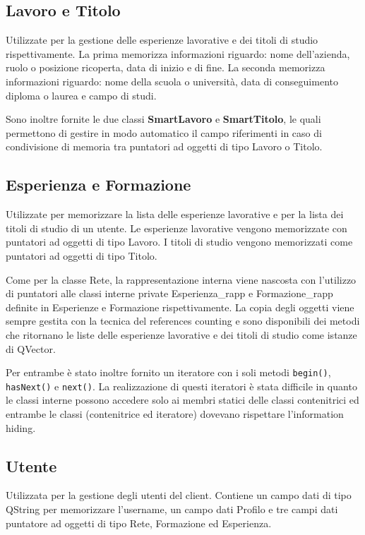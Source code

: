 \documentclass[a4paper]{article}
\begin{document}
\subsection*{Lavoro e Titolo}
Utilizzate per la gestione delle esperienze lavorative e dei titoli di studio rispettivamente. La prima memorizza informazioni riguardo: nome dell'azienda, ruolo o posizione ricoperta, data di inizio e di fine. La seconda memorizza informazioni riguardo: nome della scuola o università, data di conseguimento diploma o laurea e campo di studi.

Sono inoltre fornite le due classi \textbf{SmartLavoro} e \textbf{SmartTitolo}, le quali permettono di gestire in modo automatico il campo riferimenti in caso di condivisione di memoria tra puntatori ad oggetti di tipo Lavoro o Titolo.

\subsection*{Esperienza e Formazione}
Utilizzate per memorizzare la lista delle esperienze lavorative e per la lista dei titoli di studio di un utente. Le esperienze lavorative vengono memorizzate con puntatori ad oggetti di tipo Lavoro. I titoli di studio vengono memorizzati come puntatori ad oggetti di tipo Titolo.

Come per la classe Rete, la rappresentazione interna viene nascosta con l'utilizzo di puntatori alle classi interne private Esperienza\_rapp e Formazione\_rapp definite in Esperienze e Formazione rispettivamente. La copia degli oggetti viene sempre gestita con la tecnica del references counting e sono disponibili dei metodi che ritornano le liste delle esperienze lavorative e dei titoli di studio come istanze di QVector.

Per entrambe è stato inoltre fornito un iteratore con i soli metodi \texttt{begin()}, \texttt{hasNext()} e \texttt{next()}. La realizzazione di questi iteratori è stata difficile in quanto le classi interne possono accedere solo ai membri statici delle classi contenitrici ed entrambe le classi (contenitrice ed iteratore) dovevano rispettare l'information hiding.

\subsection*{Utente}
Utilizzata per la gestione degli utenti del client. Contiene un campo dati di tipo QString per memorizzare l'username, un campo dati Profilo e tre campi dati puntatore ad oggetti di tipo Rete, Formazione ed Esperienza. 
\end{document}
